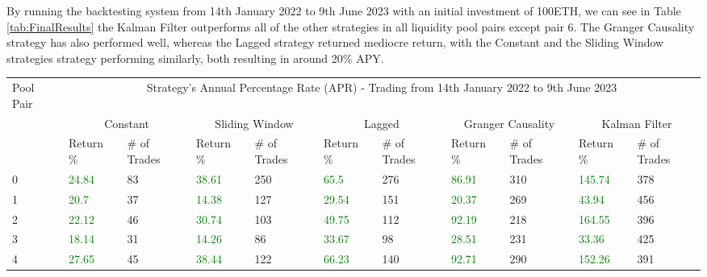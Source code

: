 \noindent By running the backtesting system from 14th January 2022 to 9th June 2023 with an initial investment of 100ETH, we can see in Table \ref{tab:FinalResults} the Kalman Filter outperforms all of the other strategies in all liquidity pool pairs except pair 6. The Granger Causality strategy has also performed well, whereas the Lagged strategy returned mediocre return, with the Constant and the Sliding Window strategies strategy performing similarly, both resulting in around 20\% APY.
\\[3mm]
\begin{table}[H]
    \centering
    \begin{adjustwidth}{-0.8in}{-0.9in}
        \begin{tabular}{|p{4em}|p{3em}|p{3em}|p{3em}|p{3em}|p{3em}|p{3em}|p{3em}|p{3em}|p{3em}|p{3em}|}\hline
            Pool Pair & \multicolumn{10}{|c|}{Strategy's Annual Percentage Rate (APR) - Trading from 14th January 2022 to 9th June 2023} \\\cline{2-11}
            & \multicolumn{2}{|c|}{Constant} & \multicolumn{2}{|c|}{Sliding Window} & \multicolumn{2}{|c|}{Lagged} & \multicolumn{2}{|c|}{Granger Causality} & \multicolumn{2}{|c|}{Kalman Filter}\\\cline{2-11}
            & Return \% & \# of Trades & Return \% & \# of Trades & Return \% & \# of Trades & Return \% & \# of Trades & Return \% & \# of Trades\\\hline
            0 & \textcolor{green}{24.84} & 83 & \textcolor{green}{38.61} & 250 & \textcolor{green}{65.5} & 276 & \textcolor{green}{86.91} & 310 & \textcolor{green}{145.74} & 378\\\cline{2-11}
            1 & \textcolor{green}{20.7} & 37 & \textcolor{green}{14.38} & 127 & \textcolor{green}{29.54} & 151 & \textcolor{green}{20.37} & 269 & \textcolor{green}{43.94} & 456\\\cline{2-11}
            2 & \textcolor{green}{22.12} & 46 & \textcolor{green}{30.74} & 103 & \textcolor{green}{49.75} & 112 & \textcolor{green}{92.19} & 218 & \textcolor{green}{164.55} & 396\\\cline{2-11}
            3 & \textcolor{green}{18.14} & 31 & \textcolor{green}{14.26} & 86 & \textcolor{green}{33.67} & 98 & \textcolor{green}{28.51} & 231 & \textcolor{green}{33.36} & 425\\\cline{2-11}
            4 & \textcolor{green}{27.65} & 45 & \textcolor{green}{38.44} & 122 & \textcolor{green}{66.23} & 140 & \textcolor{green}{92.71} & 290 & \textcolor{green}{152.26} & 391\\\cline{2-11}

\end{tabular}
\end{adjustwidth}
\end{table}
